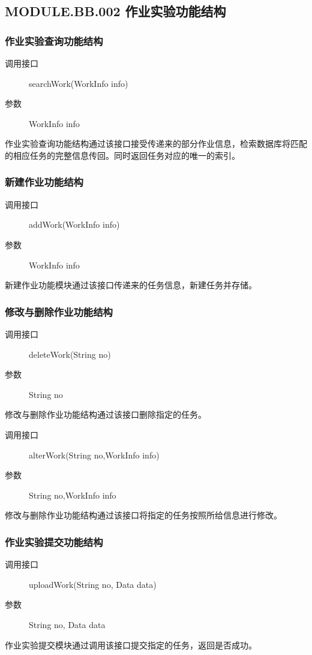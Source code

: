 \subsection{MODULE.BB.002 作业实验功能结构}
  \subsubsection{作业实验查询功能结构}
  \begin{description}
    \item[调用接口]searchWork(WorkInfo info)
    \item[参数]WorkInfo info
  \end{description}
  作业实验查询功能结构通过该接口接受传递来的部分作业信息，检索数据库将匹配的相应任务的完整信息传回。同时返回任务对应的唯一的索引。
  \subsubsection{新建作业功能结构}
  \begin{description}
    \item[调用接口]addWork(WorkInfo info)
    \item[参数]WorkInfo info
  \end{description}
  新建作业功能模块通过该接口传递来的任务信息，新建任务并存储。
  \subsubsection{修改与删除作业功能结构}
  \begin{description}
    \item[调用接口]deleteWork(String no)
    \item[参数]String no
  \end{description}
  修改与删除作业功能结构通过该接口删除指定的任务。
  \begin{description}
    \item[调用接口]alterWork(String no,WorkInfo info)
    \item[参数]String no,WorkInfo info
  \end{description}
  修改与删除作业功能结构通过该接口将指定的任务按照所给信息进行修改。
  \subsubsection{作业实验提交功能结构}
  \begin{description}
    \item[调用接口]uploadWork(String no, Data data)
    \item[参数]String no, Data data
  \end{description}
  作业实验提交模块通过调用该接口提交指定的任务，返回是否成功。

